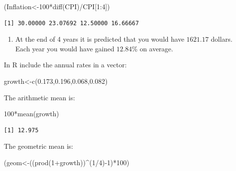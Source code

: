 \documentclass[
  letterpaper,
  DIV=11,
  numbers=noendperiod]{scrreprt}
\newenvironment{Shaded}{\begin{snugshade}}{\end{snugshade}}
\newcommand{\DecValTok}[1]{\textcolor[rgb]{0.68,0.00,0.00}{#1}}
\newcommand{\FloatTok}[1]{\textcolor[rgb]{0.68,0.00,0.00}{#1}}
\newcommand{\FunctionTok}[1]{\textcolor[rgb]{0.28,0.35,0.67}{#1}}
\newcommand{\NormalTok}[1]{\textcolor[rgb]{0.00,0.23,0.31}{#1}}
\newcommand{\OtherTok}[1]{\textcolor[rgb]{0.00,0.23,0.31}{#1}}
\newcommand{\SpecialCharTok}[1]{\textcolor[rgb]{0.37,0.37,0.37}{#1}}
\providecommand{\tightlist}{%
  \setlength{\itemsep}{0pt}\setlength{\parskip}{0pt}}\usepackage{longtable,booktabs,array}
\begin{document}
\begin{Shaded}
\begin{Highlighting}[numbers=left,,]
\NormalTok{(Inflation}\OtherTok{\textless{}{-}}\DecValTok{100}\SpecialCharTok{*}\FunctionTok{diff}\NormalTok{(CPI)}\SpecialCharTok{/}\NormalTok{CPI[}\DecValTok{1}\SpecialCharTok{:}\DecValTok{4}\NormalTok{])}
\end{Highlighting}
\end{Shaded}

\begin{verbatim}
[1] 30.00000 23.07692 12.50000 16.66667
\end{verbatim}

\begin{enumerate}
\def\labelenumi{\arabic{enumi}.}
\setcounter{enumi}{1}
\tightlist
\item
  At the end of 4 years it is predicted that you would have \(1621.17\)
  dollars. Each year you would have gained \(12.84\)\% on average.
\end{enumerate}

In R include the annual rates in a vector:

\begin{Shaded}
\begin{Highlighting}[numbers=left,,]
\NormalTok{growth}\OtherTok{\textless{}{-}}\FunctionTok{c}\NormalTok{(}\FloatTok{0.173}\NormalTok{,}\FloatTok{0.196}\NormalTok{,}\FloatTok{0.068}\NormalTok{,}\FloatTok{0.082}\NormalTok{)}
\end{Highlighting}
\end{Shaded}

The arithmetic mean is:

\begin{Shaded}
\begin{Highlighting}[numbers=left,,]
\DecValTok{100}\SpecialCharTok{*}\FunctionTok{mean}\NormalTok{(growth)}
\end{Highlighting}
\end{Shaded}

\begin{verbatim}
[1] 12.975
\end{verbatim}

The geometric mean is:

\begin{Shaded}
\begin{Highlighting}[numbers=left,,]
\NormalTok{(geom}\OtherTok{\textless{}{-}}\NormalTok{((}\FunctionTok{prod}\NormalTok{(}\DecValTok{1}\SpecialCharTok{+}\NormalTok{growth))}\SpecialCharTok{\^{}}\NormalTok{(}\DecValTok{1}\SpecialCharTok{/}\DecValTok{4}\NormalTok{)}\SpecialCharTok{{-}}\DecValTok{1}\NormalTok{)}\SpecialCharTok{*}\DecValTok{100}\NormalTok{)}
\end{Highlighting}
\end{Shaded}
\end{document}
